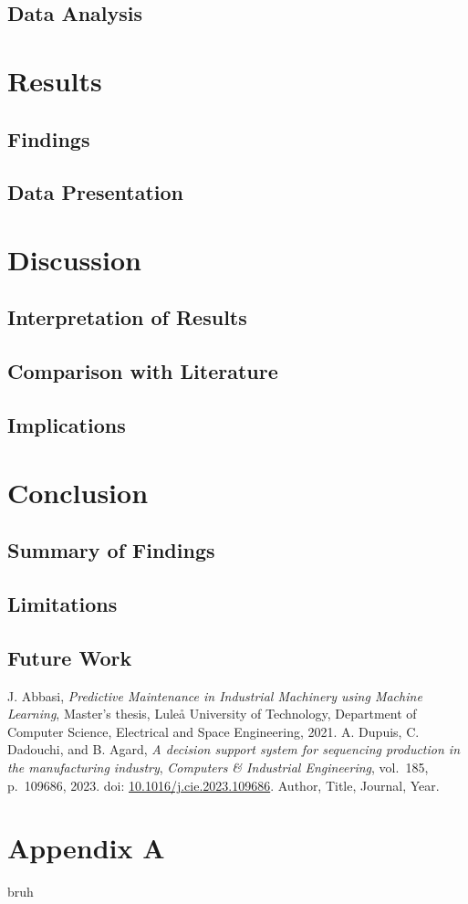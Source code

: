 \documentclass[12pt,a4paper]{report}
\begin{document}
\section{Data Analysis}

\chapter{Results}
\section{Findings}
\section{Data Presentation}

\chapter{Discussion}
\section{Interpretation of Results}
\section{Comparison with Literature}
\section{Implications}

\chapter{Conclusion}
\section{Summary of Findings}
\section{Limitations}
\section{Future Work}

\begin{thebibliography}{99}
J. Abbasi, \textit{Predictive Maintenance in Industrial Machinery using Machine Learning}, 
Master’s thesis, Luleå University of Technology, Department of Computer Science, Electrical and Space Engineering, 2021.
A. Dupuis, C. Dadouchi, and B. Agard, 
        \textit{A decision support system for sequencing production in the manufacturing industry},
\textit{Computers \& Industrial Engineering}, vol.~185, p.~109686, 2023. 
doi: \href{https://doi.org/10.1016/j.cie.2023.109686}{10.1016/j.cie.2023.109686}.
 Author, Title, Journal, Year.

\end{thebibliography}

\appendix
\chapter{Appendix A}
    bruh
\end{document}

